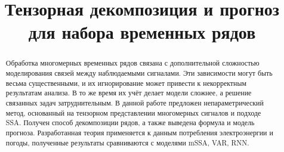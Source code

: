 
\usepackage[backend=biber, sorting=none]{biblatex}
\usepackage{subfigure}



\theoremstyle{definition}
\newtheorem*{Def}{Определение}
\theoremstyle{plain}
\newtheorem{Lem}{Лемма}
\newtheorem{Th}{Теорема}

\newcommand{\delayV}[1]{\overset{\leftarrow}{\mathbf{x}}_{#1}}
\newcommand{\delayM}[1]{\overset{\leftarrow}{\mathbf{X}}_{#1}}

\linespread{1.5}
\setlength{\parindent}{1.25cm}

\setcounter{page}{2}

\title{Тензорная декомпозиция и прогноз для набора временных рядов}

\date{}


	
	\hspace{0pt}
	\vfill
	\begin{center}
		\tableofcontents
	\end{center}
	\vfill
	\hspace{0pt}
	
	\newpage
	
	\hspace{0pt}
	\vfill
	
	\begin{abstract}
		
		Обработка многомерных временных рядов связана с дополнительной сложностью моделирования связей между наблюдаемыми сигналами. Эти зависимости могут быть весьма существенными, и их игнорирование может привести к некорректным результатам анализа. В то же время их учёт делает модели сложнее, а решение связанных задач затруднительным. В данной работе предложен непараметрический метод, основанный на тензорном представлении многомерных сигналов и подходе SSA. Получен способ декомпозиции рядов, а также выведена формула и модель прогноза. Разработанная теория применяется к данным потребления электроэнергии и погоды, полученные результаты сравниваются с моделями mSSA, VAR, RNN.
		
	\end{abstract}
	
